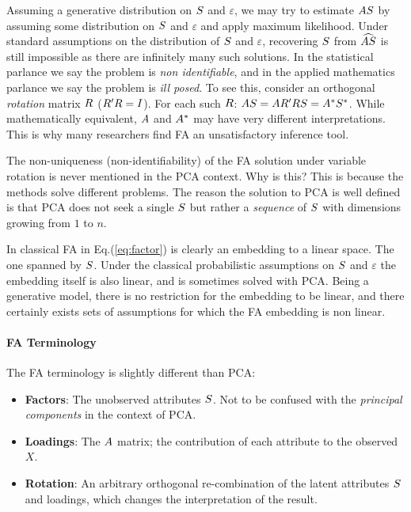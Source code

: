 \documentclass[12pt,a4paper]{article}
\begin{document}
Assuming a generative distribution on $S$ and $\varepsilon$, we may try to estimate $A S$ by assuming some distribution on $S$ and $\varepsilon$ and apply maximum likelihood.
Under standard assumptions on the distribution of $S$ and $\varepsilon$, recovering  $S$ from $\widehat{AS}$ is still impossible as there are infinitely many such solutions.
In the statistical parlance we say the problem is \emph{non identifiable}, and in the applied mathematics parlance we say the problem is \emph{ill posed}.
To see this, consider an orthogonal \emph{rotation} matrix $R$ ($R' R=I$). For each such $R$: $ A S=A R' R S = A^* S^*$.
While mathematically equivalent, $A$ and $A^*$ may have very different interpretations. 
This is why many researchers find FA an unsatisfactory inference tool.


\begin{remark}
	The non-uniqueness (non-identifiability) of the FA solution under variable rotation is never mentioned in the PCA context. Why is this?
	This is because the methods solve different problems. 
	The reason the solution to PCA is well defined is that PCA does not seek a single $S$ but rather a \emph{sequence} of $S$ with dimensions growing from $1$ to $n$. 
\end{remark}


\begin{remark}
	In classical FA in Eq.(\ref{eq:factor}) is clearly an embedding to a linear space. 
	The one spanned by $S$. 
	Under the classical probabilistic assumptions on $S$ and $\varepsilon$ the embedding itself is also linear, and is sometimes solved with PCA. 
	Being a generative model, there is no restriction for the embedding to be linear, and there certainly exists sets of assumptions for which the FA embedding is non linear. 
\end{remark}

\paragraph{FA Terminology}
The FA terminology is slightly different than PCA:
\begin{itemize}
	\item \textbf{Factors}: The unobserved attributes $S$. 
	Not to be confused with the \emph{principal components} in the context of PCA.
	\item \textbf{Loadings}: 
	The $A$ matrix; the contribution of each attribute to the observed $X$.
	\item \textbf{Rotation}: An arbitrary orthogonal re-combination of the latent attributes $S$ and loadings, which changes the interpretation of the result.
\end{itemize}
\end{document}
